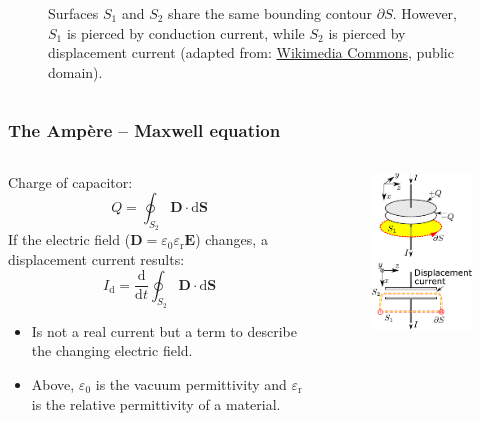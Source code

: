 \begin{frame}
\begin{columns}
\begin{column}{0.45\textwidth}
\begin{figure}
				\caption{Surfaces $S_1$ and $S_2$ share the same bounding contour $\partial S$. However, $S_1$ is pierced by conduction current, while $S_2$ is pierced by displacement current (adapted from: \href{https://commons.wikimedia.org/wiki/File:Displacement_current_in_capacitor.svg}{Wikimedia Commons}, public domain).}
			\end{figure}
		\end{column}
		\end{columns}
\end{frame}

\begin{frame}
	\frametitle{The Amp\`ere -- Maxwell equation}
	\begin{columns}
		\begin{column}{0.6\textwidth}
			Charge of capacitor:
            $$Q = \oint_{S_2} \bm{D}\cdot \mathrm{d}\bm{S}$$
            If the electric field ($\bm{D} = \varepsilon_0\varepsilon_\mathrm{r} \bm{E}$) changes, a displacement current results:
            $$I_{\mathrm{d}} = \frac{\mathrm{d}}{\mathrm{d} t} \oint_{S_2} \bm{D}\cdot \mathrm{d}\bm{S}$$
            \begin{itemize}
                \item Is not a real current but a term to describe the changing electric field.
                \item Above, $\varepsilon_0$ is the vacuum permittivity and $\varepsilon_\mathrm{r}$ is the relative permittivity of a material.
            \end{itemize}
		\end{column}
        \hfill
		\begin{column}{0.4\textwidth}
			\begin{figure}
				\centering
				\includegraphics[height=0.65\textheight]{fig/lec02/Maxwell_integral_displacement_current.pdf}

\end{figure}
\end{column}
\end{columns}
\end{frame}
